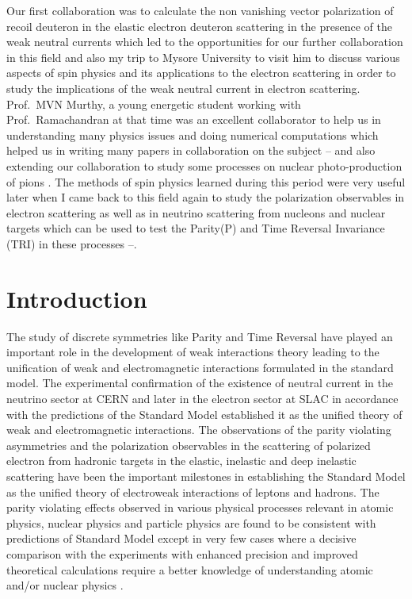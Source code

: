 Our first collaboration was to calculate the  non vanishing vector polarization of recoil deuteron in the elastic electron  deuteron   scattering in the presence of the weak neutral currents \cite{chap9-key6} which led to the opportunities for our further collaboration in this field and also my trip to Mysore University  to visit him to discuss various aspects of spin physics and its applications to the electron scattering in order to study the implications of the weak neutral current  in electron scattering. Prof.\ MVN Murthy, a young energetic student working with Prof.\ Ramachandran at that time was an excellent collaborator to help us in understanding many physics issues and doing numerical computations which helped us in writing many papers in collaboration on the subject \cite{chap9-key7}--\cite{chap9-key9} and also extending our collaboration to study some processes on nuclear photo-production of pions \cite{chap9-key10}. The methods of spin physics learned during this period were very useful later when I came back to this field again to study the polarization observables in electron scattering as well as in neutrino scattering from nucleons and nuclear targets which can be used to test the Parity(P) and Time Reversal Invariance (TRI) in these processes \cite{chap9-key11}--\cite{chap9-key15}.


\section{Introduction}\label{chap9-sec2}
  
The study of discrete symmetries like Parity and Time Reversal have played an important role in the development of weak interactions theory leading to the unification of weak and electromagnetic interactions formulated in the standard model. The experimental confirmation of the existence of neutral current in the neutrino sector at CERN and later in the electron sector at SLAC in accordance with the predictions of the Standard Model  established it as the unified theory of weak and electromagnetic interactions.  The observations of the parity violating  asymmetries and the polarization observables in the scattering of polarized electron from  hadronic targets in the elastic,  inelastic and deep inelastic  scattering have been the important   milestones in establishing the Standard Model  as the unified theory of electroweak interactions  of  leptons and hadrons.  The parity violating effects observed in various physical processes relevant in atomic physics,  nuclear physics and particle physics are found to be consistent with  predictions of Standard Model except in very few cases where a decisive comparison with the experiments with  enhanced  precision and improved theoretical calculations require a better knowledge of  understanding atomic and/or nuclear physics \cite{chap9-key16}.
   
